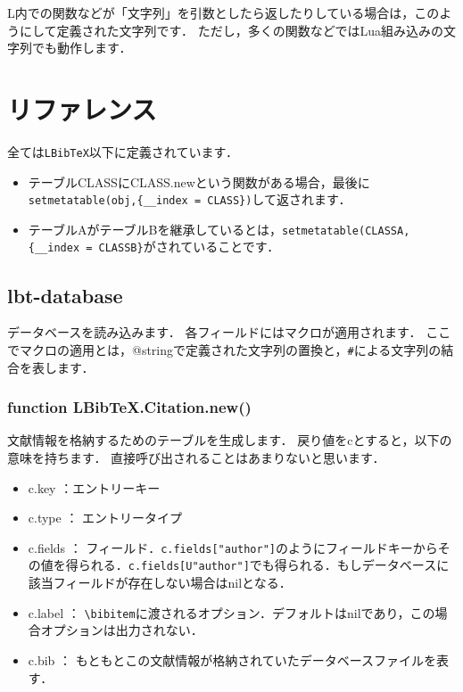 \documentclass[dvipdfmx,a4paper]{jsarticle}
\DeclareRobustCommand{\LBibTeX}{L\BibTeX}
\begin{document}
\LBibTeX 内での関数などが「文字列」を引数としたら返したりしている場合は，このようにして定義された文字列です．
ただし，多くの関数などではLua組み込みの文字列でも動作します．

\section{リファレンス}
全ては\verb|LBibTeX|以下に定義されています．
\begin{itemize}
\item テーブルCLASSにCLASS.newという関数がある場合，最後に\verb|setmetatable(obj,{__index = CLASS})|して返されます．
\item テーブルAがテーブルBを継承しているとは，\verb|setmetatable(CLASSA,{__index = CLASSB}|がされていることです．
\end{itemize}

\subsection{lbt-database}\label{subsec:lbt-database}
データベースを読み込みます．
各フィールドにはマクロが適用されます．
ここでマクロの適用とは，@stringで定義された文字列の置換と，\verb|#|による文字列の結合を表します．
\subsubsection{function LBibTeX.Citation.new()}
文献情報を格納するためのテーブルを生成します．
戻り値をcとすると，以下の意味を持ちます．
直接呼び出されることはあまりないと思います．
\begin{itemize}
\item c.key ：エントリーキー
\item c.type ： エントリータイプ
\item c.fields ： フィールド．\verb|c.fields["author"]|のようにフィールドキーからその値を得られる．\verb|c.fields[U"author"]|でも得られる．もしデータベースに該当フィールドが存在しない場合はnilとなる．
\item c.label ： \verb|\bibitem|に渡されるオプション．デフォルトはnilであり，この場合オプションは出力されない．
\item c.bib ： もともとこの文献情報が格納されていたデータベースファイルを表す．
\end{itemize}
\end{document}
